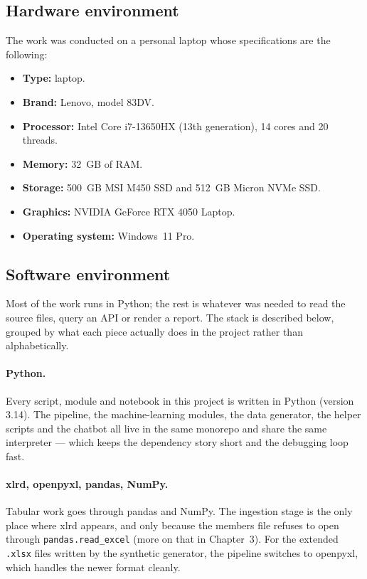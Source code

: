 \documentclass[12pt, a4paper]{report}
\begin{document}
\subsection{Hardware environment}

The work was conducted on a personal laptop whose specifications are the
following:

\begin{itemize}[noitemsep]
  \item \textbf{Type:} laptop.
  \item \textbf{Brand:} Lenovo, model 83DV.
  \item \textbf{Processor:} Intel Core i7-13650HX (13th generation),
        14 cores and 20 threads.
  \item \textbf{Memory:} 32~GB of RAM.
  \item \textbf{Storage:} 500~GB MSI M450 SSD and 512~GB Micron NVMe SSD.
  \item \textbf{Graphics:} NVIDIA GeForce RTX 4050 Laptop.
  \item \textbf{Operating system:} Windows~11 Pro.
\end{itemize}

\subsection{Software environment}

Most of the work runs in Python; the rest is whatever was needed to
read the source files, query an API or render a report. The stack is
described below, grouped by what each piece actually does in the
project rather than alphabetically.

\paragraph{Python.} Every script, module and notebook in this project
is written in Python (version 3.14). The pipeline, the
machine-learning modules, the data generator, the helper scripts and
the chatbot all live in the same monorepo and share the same
interpreter --- which keeps the dependency story short and the
debugging loop fast.

\paragraph{xlrd, openpyxl, pandas, NumPy.} Tabular work goes through
pandas and NumPy. The ingestion stage is the only place where xlrd
appears, and only because the members file refuses to open through
\texttt{pandas.read\_excel} (more on that in Chapter~3). For the
extended \texttt{.xlsx} files written by the synthetic generator, the
pipeline switches to openpyxl, which handles the newer format
cleanly.
\end{document}
